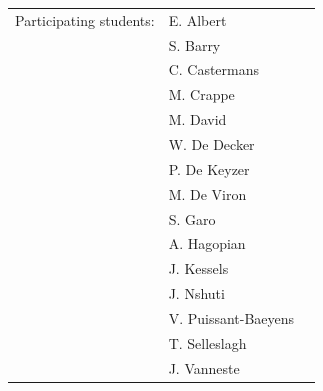 \begin{titlepage}
\begin{center}
\begin{tabular}{lll}
    Participating students:
        & E. Albert & \\
        & S. Barry & \\
        & C. Castermans & \\
        & M. Crappe & \\
        & M. David & \\
        & W. De Decker & \\
        & P. De Keyzer & \\
        & M. De Viron & \\
        & S. Garo & \\
        & A. Hagopian & \\
        & J. Kessels & \\
        & J. Nshuti & \\ 
        & V. Puissant-Baeyens & \\
        & T. Selleslagh & \\
        & J. Vanneste & 
\end{tabular}

\end{center}

\end{titlepage}

